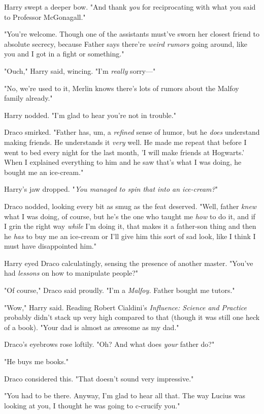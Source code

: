 Harry swept a deeper bow. "And thank \emph{you} for reciprocating with what you 
said to Professor McGonagall."

"You're welcome. Though one of the assistants must've sworn her closest friend 
to absolute secrecy, because Father says there're \emph{weird rumors} going 
around, like you and I got in a fight or something."

"Ouch," Harry said, wincing. "I'm \emph{really} sorry---"

"No, we're used to it, Merlin knows there's lots of rumors about the Malfoy 
family already."

Harry nodded. "I'm glad to hear you're not in trouble."

Draco smirked. "Father has, um, a \emph{refined} sense of humor, but he 
\emph{does} understand making friends. He understands it \emph{very} well. He 
made me repeat that before I went to bed every night for the last month, 'I 
will make friends at Hogwarts.' When I explained everything to him and he saw 
that's what I was doing, he bought me an ice-cream."

Harry's jaw dropped. "\emph{You managed to spin that into an ice-cream?}"

Draco nodded, looking every bit as smug as the feat deserved. "Well, father 
\emph{knew} what I was doing, of course, but he's the one who taught me 
\emph{how} to do it, and if I grin the right way \emph{while} I'm doing it, 
that makes it a father-son thing and then he \emph{has} to buy me an ice-cream 
or I'll give him this sort of sad look, like I think I must have disappointed 
him."

Harry eyed Draco calculatingly, sensing the presence of another master. "You've 
had \emph{lessons} on how to manipulate people?"

"Of course," Draco said proudly. "I'm a \emph{Malfoy.} Father bought me tutors."

"Wow," Harry said. Reading Robert Cialdini's \emph{Influence: Science and 
Practice} probably didn't stack up very high compared to that (though it was 
still one heck of a book). "Your dad is almost as awesome as my dad."

Draco's eyebrows rose loftily. "Oh? And what does \emph{your} father do?"

"He buys me books."

Draco considered this. "That doesn't sound very impressive."

"You had to be there. Anyway, I'm glad to hear all that. The way Lucius was 
looking at you, I thought he was going to c-crucify you."

